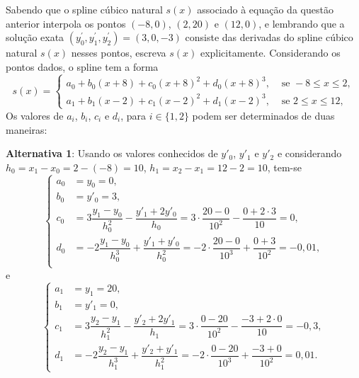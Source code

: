 \documentclass[12pt,a4paper]{article}
\begin{document}
\begin{ExerciseList}
\Exercise[title={2,0}] Sabendo que o spline cúbico natural $s(x)$ associado à equação da questão anterior interpola os pontos $(-8, 0)$, $(2, 20)$ e $(12, 0)$, e lembrando que a solução exata $(y_0^\prime, y_1^\prime, y_2^\prime) = (3, 0, -3)$ consiste das derivadas do spline cúbico natural $s(x)$ nesses pontos, escreva $s(x)$ explicitamente.
\Answer Considerando os pontos dados, o spline tem a forma
\[
  s(x) =
  \begin{cases}
    a_0 + b_0(x + 8) + c_0(x + 8)^2 +d_0(x + 8)^3, & \text{ se } -8 \leq x \leq 2,\\
    a_1 + b_1(x - 2) + c_1(x - 2)^2 +d_1(x - 2)^3, & \text{ se } 2 \leq x \leq 12,
  \end{cases}
\]
Os valores de $a_i$, $b_i$, $c_i$ e $d_i$, para $i \in \{1, 2\}$ podem ser determinados de duas maneiras:

\textbf{Alternativa 1}: Usando os valores conhecidos de $y'_0$, $y'_1$ e $y'_2$ e considerando $h_0 = x_1 - x_0 = 2 - (-8) = 10$, $h_1 = x_2 - x_1 = 12 - 2 = 10$, tem-se
\[
\begin{cases}
  a_0 & = y_0 = 0,\\
  b_0 & = y'_0 = 3,\\
  c_0 & = 3\dfrac{y_1-y_0}{h_0^2}-\dfrac{y'_1+2y'_0}{h_0}
        = 3\cdot \dfrac{20-0}{10^2}-\dfrac{0 + 2\cdot 3}{10}
        = 0,\\
  d_0 & = -2\dfrac{y_1-y_0}{h_0^3}+\dfrac{y'_1+y'_0}{h_0^2}
        = -2\cdot \dfrac{20-0}{10^3}+\dfrac{0+3}{10^2}
        = -0,01,\\
\end{cases}
\]
e
\[
\begin{cases}
  a_1 & = y_1 = 20,\\
  b_1 & = y'_1 = 0,\\
  c_1 & = 3\dfrac{y_2-y_1}{h_1^2}-\dfrac{y'_2+2y'_1}{h_1}
        = 3\cdot \dfrac{0-20}{10^2}-\dfrac{-3 + 2\cdot 0}{10}
        = -0,3,\\
  d_1 & = -2\dfrac{y_2-y_1}{h_1^3}+\dfrac{y'_2+y'_1}{h_1^2}
        = -2\cdot \dfrac{0-20}{10^3}+\dfrac{-3+0}{10^2}
        = 0,01.
\end{cases}
\]


\end{ExerciseList}
\end{document}
